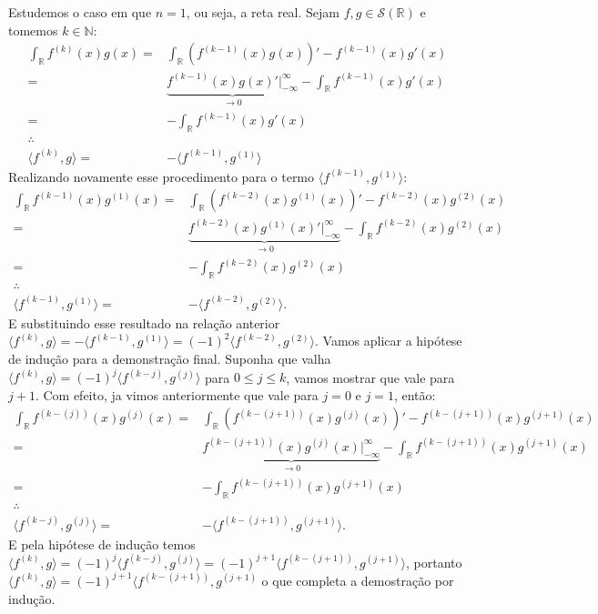 \documentclass{article}
\begin{document}
\begin{enumerate}
		Estudemos o caso em que $n = 1$, ou seja, a reta real. Sejam $f, g \in \mathcal{S}(\mathbb{R})$ e tomemos $k \in \mathbb{N}$:
		$$
		\begin{aligned}
		\int_{\mathbb{R}} f^{(k)}(x)g(x) = & \int_{\mathbb{R}} (f^{(k-1)}(x)g(x))' - f^{(k-1)}(x)g'(x)
		\\ 
		= & \underbrace{ f^{(k-1)}(x)g(x)'\Big|^{\infty}_{-\infty} }_{\to 0}- \int_{\mathbb{R}}  f^{(k-1)}(x)g'(x)
		\\ 
		= & -\int_{\mathbb{R}}  f^{(k-1)}(x)g'(x) \;
		\\
		 \therefore &
		 \\
		\langle f^{(k)},g \rangle = & - \langle f^{(k-1)},g^{(1)} \rangle
		\end{aligned}
		$$
		Realizando novamente esse procedimento para o termo $\langle f^{(k-1)},g^{(1)} \rangle$:
		$$
		\begin{aligned}
		\int_{\mathbb{R}} f^{(k-1)}(x)g^{(1)}(x) = & \int_{\mathbb{R}} (f^{(k-2)}(x)g^{(1)}(x))' - f^{(k-2)}(x)g^{(2)}(x)
		\\ 
		= & \underbrace{ f^{(k-2)}(x)g^{(1)}(x)'\Big|^{\infty}_{-\infty} }_{\to 0}- \int_{\mathbb{R}}  f^{(k-2)}(x)g^{(2)} (x)
		\\ 
		= & -\int_{\mathbb{R}}  f^{(k-2)}(x)g^{(2)} (x) \;  
		\\
		\therefore &
		\\
		\langle f^{(k-1)},g^{(1)} \rangle = & - \langle f^{(k-2)},g^{(2)} \rangle.
		\end{aligned}
		$$
		E substituindo esse resultado na relação anterior $\langle f^{(k)},g \rangle = - \langle f^{(k-1)},g^{(1)} \rangle = (-1)^{2} \langle f^{(k-2)},g^{(2)} \rangle$. Vamos aplicar a hipótese de indução para a demonstração final. Suponha que valha $\langle f^{(k)},g \rangle = (-1)^{j} \langle f^{(k-j)},g^{(j)} \rangle$ para $0 \leq j \leq k$, vamos mostrar que vale para $j+1$. Com efeito, ja vimos anteriormente que vale para $j=0$ e $j=1$, então:
		$$
		\begin{aligned}
		\int_{\mathbb{R}} f^{(k-(j))}(x)g^{(j)}(x) = & \int_{\mathbb{R}} (f^{(k-(j+1))}(x)g^{(j)}(x))' - f^{(k-(j+1))}(x)g^{(j+1)}(x)
		\\ 
		= & \underbrace{ f^{(k-(j+1))}(x)g^{(j)}(x)\Big|^{\infty}_{-\infty} }_{\to 0}- \int_{\mathbb{R}}  f^{(k-(j+1))}(x)g^{(j+1)}(x)
		\\ 
		= & -\int_{\mathbb{R}}  f^{(k-(j+1))}(x)g^{(j+1)}(x) \; 
		\\
		\therefore &
		\\
		\langle f^{(k-j)},g^{(j)} \rangle = & - \langle f^{(k-(j+1))},g^{(j+1)} \rangle.
		\end{aligned}
		$$
		E pela hipótese de indução temos $\langle f^{(k)},g \rangle = (-1)^{j} \langle f^{(k-j)},g^{(j)} \rangle = (-1)^{j+1}\langle f^{(k-(j+1))},g^{(j+1)} \rangle$, portanto $\langle f^{(k)},g \rangle = (-1)^{j+1}\langle f^{(k-(j+1))},g^{(j+1)}$ o que completa a demostração por indução. 
		

\end{enumerate}
\end{document}
